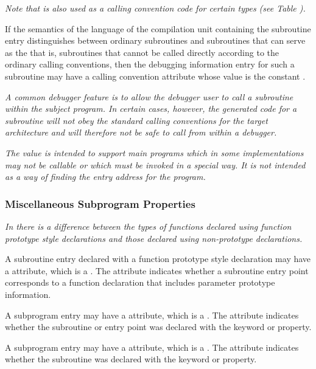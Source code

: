 \textit{Note that \DWCCnormal{} is also used as a calling convention 
code for certain types 
(see Table ).}

If the semantics of the language of the compilation unit
containing the subroutine entry distinguishes between ordinary
subroutines and subroutines that can serve as the  that is, subroutines that cannot be called
directly according to the ordinary calling conventions,
then the debugging information entry for such a subroutine
may have a calling convention attribute whose value is the
constant \DWCCprogramTARG.

\textit{A common debugger feature is to allow the debugger user to call
a subroutine within the subject program. In certain cases,
however, the generated code for a subroutine will not obey
the standard calling conventions for the target architecture
and will therefore not be safe to call from within a debugger.}

\textit{The \DWCCprogram{} 
value is intended to support  main
programs which in some implementations may not be callable
or which must be invoked in a special way. It is not intended
as a way of finding the entry address for the program.}


\subsubsection{Miscellaneous Subprogram Properties}
\textit{In 
there is a difference between the types of functions
declared using function prototype style declarations and
those declared using non-prototype declarations.}

A subroutine entry declared with a function prototype style
declaration may have a
\DWATprototypedDEFN{} attribute, which is
a \CLASSflag. 
The attribute indicates whether a subroutine entry point corresponds
to a function declaration that includes parameter prototype information.

A subprogram entry may have 
a\hypertarget{chap:DWATelementalelementalpropertyofasubroutine}{}
\DWATelementalDEFN{} attribute, 
which is a . 
The attribute indicates whether the subroutine
or entry point was declared with the  keyword
or property.

A\hypertarget{chap:DWATpurepurepropertyofasubroutine}{}
subprogram entry may have a
\DWATpureDEFN{} attribute, which is
a . 
The attribute indicates whether the subroutine was
declared with the  keyword or property.

